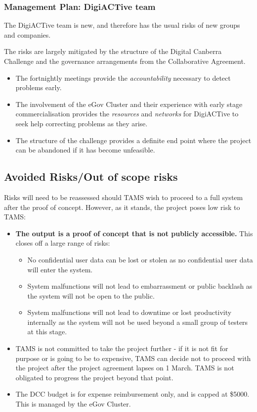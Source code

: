 \documentclass[12pt,a4paper,twosided]{article}
\begin{document}
\subsubsection{Management Plan: DigiACTive team}

The DigiACTive team is new, and therefore has the usual risks of new
groups and companies.

The risks are largely mitigated by the structure of the Digital Canberra
Challenge and the governance arrangements from the Collaborative
Agreement.

\begin{itemize}
\itemsep1pt\parskip0pt
\item
  The fortnightly meetings provide the \emph{accountability} necessary
  to detect problems early.
\item
  The involvement of the eGov Cluster and their experience with early
  stage commercialisation provides the \emph{resources} and
  \emph{networks} for DigiACTive to seek help correcting problems as
  they arise.
\item
  The structure of the challenge provides a definite end point where the
  project can be abandoned if it has become unfeasible.
\end{itemize}

\subsection{Avoided Risks/Out of scope risks}

Risks will need to be reassessed should TAMS wish to proceed to a full
system after the proof of concept. However, as it stands, the project
poses low risk to TAMS:

\begin{itemize}
\itemsep1pt\parskip0pt
\item
  \textbf{The output is a proof of concept that is not publicly
  accessible.} This closes off a large range of risks:

  \begin{itemize}
  \itemsep1pt\parskip0pt
  \item
    No confidential user data can be lost or stolen as no confidential
    user data will enter the system.
  \item
    System malfunctions will not lead to embarrassment or public
    backlash as the system will not be open to the public.
  \item
    System malfunctions will not lead to downtime or lost productivity
    internally as the system will not be used beyond a small group of
    testers at this stage.
  \end{itemize}
\item
  TAMS is not committed to take the project further - if it is not fit
  for purpose or is going to be to expensive, TAMS can decide not to
  proceed with the project after the project agreement lapses on 1
  March. TAMS is not obligated to progress the project beyond that
  point.
\item
  The DCC budget is for expense reimbursement only, and is capped at
  \$5000. This is managed by the eGov Cluster.
\end{itemize}
\end{document}
